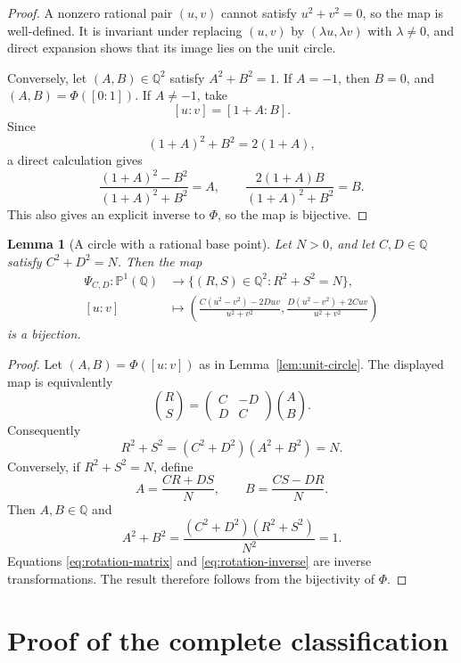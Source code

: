 \documentclass[11pt]{article}
\numberwithin{equation}{section}
\newtheorem{lemma}[theorem]{Lemma}
\theoremstyle{definition}
\theoremstyle{remark}
\newcommand{\Q}{\mathbb{Q}}
\newcommand{\Pone}{\mathbb{P}^{1}}
\begin{document}
\begin{proof}
A nonzero rational pair $(u,v)$ cannot satisfy $u^{2}+v^{2}=0$, so the
map is well-defined.  It is invariant under replacing $(u,v)$ by
$(\lambda u,\lambda v)$ with $\lambda\ne0$, and direct expansion shows
that its image lies on the unit circle.

Conversely, let $(A,B)\in\Q^{2}$ satisfy $A^{2}+B^{2}=1$.  If $A=-1$,
then $B=0$, and $(A,B)=\Phi([0:1])$.  If $A\ne-1$, take
\[
 [u:v]=[1+A:B].
\]
Since
\[
 (1+A)^{2}+B^{2}=2(1+A),
\]
a direct calculation gives
\[
 \frac{(1+A)^{2}-B^{2}}{(1+A)^{2}+B^{2}}=A,
 \qquad
 \frac{2(1+A)B}{(1+A)^{2}+B^{2}}=B.
\]
This also gives an explicit inverse to $\Phi$, so the map is bijective.
\end{proof}

\begin{lemma}[A circle with a rational base point]\label{lem:general-circle}
Let $N>0$, and let $C,D\in\Q$ satisfy $C^{2}+D^{2}=N$.  Then the map
\begin{align}
 \Psi_{C,D}:\Pone(\Q)&\longrightarrow
 \{(R,S)\in\Q^{2}:R^{2}+S^{2}=N\},\label{eq:general-circle-map}\\
 [u:v]&\longmapsto
 \left(
 \frac{C(u^{2}-v^{2})-2Duv}{u^{2}+v^{2}},
 \frac{D(u^{2}-v^{2})+2Cuv}{u^{2}+v^{2}}
 \right)
\end{align}
is a bijection.
\end{lemma}

\begin{proof}
Let $(A,B)=\Phi([u:v])$ as in Lemma~\ref{lem:unit-circle}.  The displayed
map is equivalently
\begin{equation}\label{eq:rotation-matrix}
 \binom{R}{S}
 =
 \begin{pmatrix}C&-D\\D&C\end{pmatrix}
 \binom{A}{B}.
\end{equation}
Consequently
\[
 R^{2}+S^{2}=(C^{2}+D^{2})(A^{2}+B^{2})=N.
\]
Conversely, if $R^{2}+S^{2}=N$, define
\begin{equation}\label{eq:rotation-inverse}
 A=\frac{CR+DS}{N},
 \qquad
 B=\frac{CS-DR}{N}.
\end{equation}
Then $A,B\in\Q$ and
\[
 A^{2}+B^{2}
 =\frac{(C^{2}+D^{2})(R^{2}+S^{2})}{N^{2}}=1.
\]
Equations \eqref{eq:rotation-matrix} and
\eqref{eq:rotation-inverse} are inverse transformations.  The result
therefore follows from the bijectivity of $\Phi$.
\end{proof}

\section{Proof of the complete classification}
\end{document}
